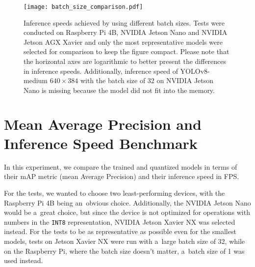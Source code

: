 \begin{figure}[H]
        \centering
        \texttt{[image: batch\_size\_comparison.pdf]}
        \caption{Inference speeds achieved by using different batch sizes. Tests
        were conducted on Raspberry Pi 4B, NVIDIA Jetson Nano and NVIDIA Jetson
        AGX Xavier and only the most representative models were selected for
        comparison to keep the figure compact. Please note that the horizontal
        axes are logarithmic to better present the differences in inference
        speeds. Additionally, inference speed of YOLOv8-medium $640 \times 384$
        with the batch size of 32 on NVIDIA Jetson Nano is missing because the
        model did not fit into the memory.}
        \label{BatchSizeComparison}
\end{figure}



\section{Mean Average Precision and Inference Speed Benchmark}
\label{FPSvsmAPComparison}

In this experiment, we compare the trained and quantized models in terms of
their mAP metric (mean Average Precision) and their inference speed in FPS.

For the tests, we wanted to choose two least-performing devices, with the
Raspberry Pi 4B being an~obvious choice. Additionally, the NVIDIA Jetson Nano
would be a~great choice, but since the device is not optimized for operations
with numbers in the \texttt{INT8} representation, NVIDIA Jetson Xavier NX was
selected instead. For the tests to be as representative as possible even for the
smallest models, tests on Jetson Xavier NX were run with a~large batch size of
32, while on the Raspberry Pi, where the batch size doesn't matter,
a~batch size of 1 was used instead.

